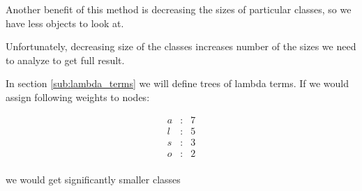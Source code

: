 \documentclass[final]{article}
\theoremstyle{definition}
\theoremstyle{remark}
\begin{document}
Another benefit of this method is decreasing the sizes of particular classes, so we have less objects to look at.

Unfortunately, decreasing size of the classes increases number of the sizes we need to analyze to get full result.

In section \ref{sub:lambda_terms} we will define trees of lambda terms. If we would assign following weights to nodes:

\[\begin{array}{rcl}
        a &:& 7\\
        l &:& 5\\
        s &:& 3\\
        o &:& 2\\
\end{array}\]

we would get significantly smaller classes
\end{document}
